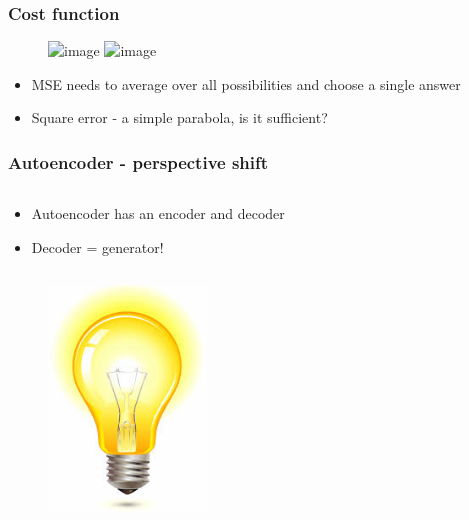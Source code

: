 \documentclass{Bredelebeamer}
\begin{document}
\begin{frame}
	\frametitle{Cost function}
	\begin{figure}[h!]
		\centering
		\includegraphics<1>[width=\textwidth]{predict_frame.png}
		\includegraphics<2->[width=\textwidth]{mse_vs_adversarial.png}
	\end{figure}
	\pause
	\begin{itemize}
		\item MSE needs to average over all possibilities and choose a single answer
		\item Square error - a simple parabola, is it sufficient?
	\end{itemize}
\end{frame}
\begin{frame}
\frametitle{Autoencoder - perspective shift}

\begin{columns}
\begin{column}{0.5\textwidth}
\begin{itemize}[<+->]
	\item Autoencoder has an encoder and decoder
	\item Decoder = generator!
\end{itemize}
\end{column}
\begin{column}{0.45\textwidth}
\begin{figure}[h!]
	\centering
\end{figure}
\end{column}
\end{columns}

\end{frame}
\begin{frame}[plain,c]
\begin{center}
	\begin{figure}[h!]
	\centering
	\includegraphics[height=6cm]{lightbulb.jpeg}
	\end{figure}
\end{center}
\end{frame}
\end{document}
